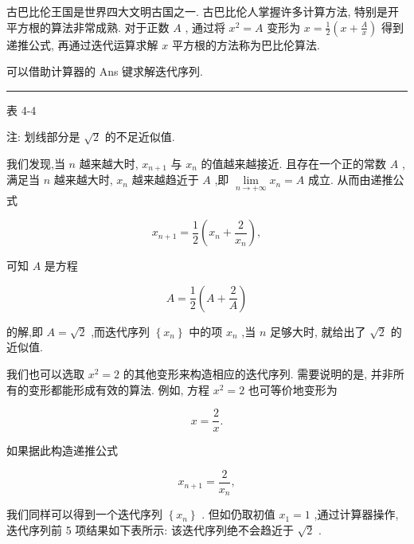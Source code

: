 \documentclass[10pt]{article}
\newcommand{\HRule}{\begin{center}\rule{0.9\linewidth}{0.2mm}\end{center}}
\begin{document}
古巴比伦王国是世界四大文明古国之一. 古巴比伦人掌握许多计算方法, 特别是开平方根的算法非常成熟. 对于正数 \(A\) , 通过将 \({x}^{2} = A\) 变形为 \(x = \frac{1}{2}\left( {x + \frac{A}{x}}\right)\) 得到递推公式, 再通过迭代运算求解 \(x\) 平方根的方法称为巴比伦算法.

可以借助计算器的 Ans 键求解迭代序列.

\HRule

表 4-4

\begin{center}
\end{center}

注: 划线部分是 \(\sqrt{2}\) 的不足近似值.

我们发现,当 \(n\) 越来越大时, \({x}_{n + 1}\) 与 \({x}_{n}\) 的值越来越接近. 且存在一个正的常数 \(A\) ,满足当 \(n\) 越来越大时, \({x}_{n}\) 越来越趋近于 \(A\) ,即 \(\mathop{\lim }\limits_{{n \rightarrow   + \infty }}{x}_{n} = A\) 成立. 从而由递推公式

\[
{x}_{n + 1} = \frac{1}{2}\left( {{x}_{n} + \frac{2}{{x}_{n}}}\right) ,
\]

可知 \(A\) 是方程

\[
A = \frac{1}{2}\left( {A + \frac{2}{A}}\right)
\]

的解,即 \(A = \sqrt{2}\) ,而迭代序列 \(\left\{  {x}_{n}\right\}\) 中的项 \({x}_{n}\) ,当 \(n\) 足够大时, 就给出了 \(\sqrt{2}\) 的近似值.

我们也可以选取 \({x}^{2} = 2\) 的其他变形来构造相应的迭代序列. 需要说明的是, 并非所有的变形都能形成有效的算法. 例如, 方程 \({x}^{2} = 2\) 也可等价地变形为

\[
x = \frac{2}{x}.
\]

如果据此构造递推公式

\[
{x}_{n + 1} = \frac{2}{{x}_{n}},
\]

我们同样可以得到一个迭代序列 \(\left\{  {x}_{n}\right\}\) . 但如仍取初值 \({x}_{1} = 1\) ,通过计算器操作, 迭代序列前 5 项结果如下表所示: 该迭代序列绝不会趋近于 \(\sqrt{2}\) .
\end{document}

